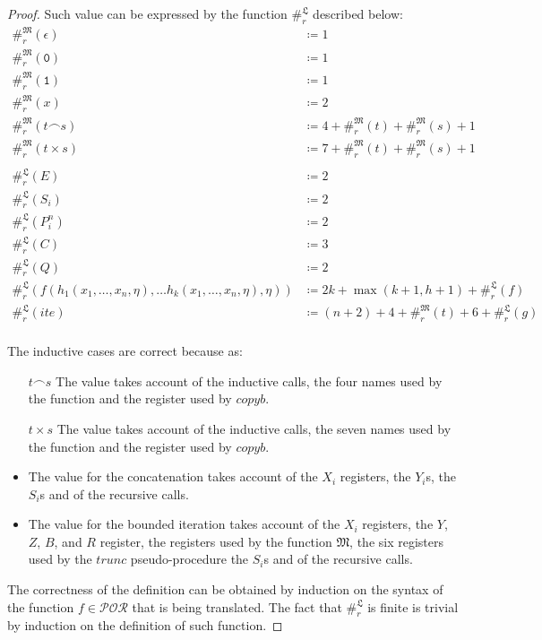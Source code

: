 \documentclass[10pt]{amsart}
\newcommand{\POR}{\mathcal{POR}}
\newcommand{\conc}{\frown}
\newcommand{\zero}{\mathtt{0}}
\newcommand{\one}{\mathtt{1}}
\newcommand{\vone}{x}
\newcommand{\LL}{\mathfrak L}
\newcommand{\MM}{\mathfrak M}
\begin{document}
\begin{proof}
Such value can be expressed by the function $\#_r^\LL$ described below:
\begin{align*}
\#_r^\MM(\epsilon)&\coloneqq 1\\
\#_r^\MM(\zero)&\coloneqq 1\\
\#_r^\MM(\one)&\coloneqq 1\\
\#_r^\MM(\vone)&\coloneqq 2\\
\#_r^\MM(t \conc s)&\coloneqq 4+\#_r^\MM(t)+\#_r^\MM(s)+1\\
\#_r^\MM(t \times s)&\coloneqq 7+\#_r^\MM(t)+\#_r^\MM(s)+1\\\\
\#_r^\LL(E)&\coloneqq 2\\
\#_r^\LL(S_i)&\coloneqq 2\\
\#_r^\LL({P}_i^n)&\coloneqq 2\\
\#_r^\LL(C)&\coloneqq 3\\
\#_r^\LL(Q)&\coloneqq 2\\
\#_r^\LL(f(h_1(\vone_1,\ldots, \vone_n, \eta), \ldots h_k(\vone_1,\ldots, \vone_n, \eta), \eta))&\coloneqq 2k+\max(k+1, h+1)+\#_r^\LL(f)\\
\#_r^\LL(ite)&\coloneqq (n+2)+4+ \#_r^\MM(t)+6+\#_r^\LL(g)\\
\end{align*}

The inductive cases are correct because as:

\begin{itemize}
\item[$t\conc s$] The value takes account of the inductive calls, the four names used by the function and the register used by $copyb$.
\item[$t\times s$] The value takes account of the inductive calls, the seven names used by the function and the register used by $copyb$.
\item The value for the concatenation takes account of the $X_i$ registers, the $Y_i$s, the $S_i$s and of the recursive calls.
\item The value for the bounded iteration takes account of the $X_i$ registers, the $Y$, $Z$, $B$, and $R$ register, the registers used by the function $\MM$, the six registers used by the $trunc$ pseudo-procedure the $S_i$s and of the recursive calls.
\end{itemize}

The correctness of the definition can be obtained by induction on the syntax of the function $f\in\POR$ that is being translated. The fact that $\#_r^\LL$ is finite is trivial by induction on the definition of such function.
\end{proof}
\end{document}
